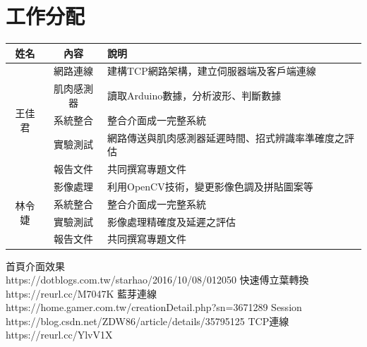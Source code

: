 \documentclass[12pt]{article}  %
\theoremstyle{plain}
\begin{document}
\section{工作分配}
\begin{tabular}{|c|c|p{9.5cm}|}
\hline
\cellcolor[HTML]{B2BEB5}姓名 & \cellcolor[HTML]{B2BEB5}內容 & \cellcolor[HTML]{B2BEB5}說明\\
\hline\hline
\multirow{5}{*}{王佳君} & 網路連線 & 建構TCP網路架構，建立伺服器端及客戶端連線 \\
\cline{2-3}
\multirow{5}{*}{} & 肌肉感測器 & 讀取Arduino數據，分析波形、判斷數據 \\
\cline{2-3}
\multirow{5}{*}{} & 系統整合 & 整合介面成一完整系統 \\
\cline{2-3}
\multirow{5}{*}{} & 實驗測試 & 網路傳送與肌肉感測器延遲時間、招式辨識率準確度之評估\\
\cline{2-3}
\multirow{5}{*}{} & 報告文件 & 共同撰寫專題文件 \\
\hline
\multirow{4}{*}{林令婕} & 影像處理 & 利用OpenCV技術，變更影像色調及拼貼圖案等 \\
\cline{2-3}
\multirow{4}{*}{} & 系統整合 & 整合介面成一完整系統 \\
\cline{2-3}
\multirow{4}{*}{} & 實驗測試 & 影像處理精確度及延遲之評估 \\
\cline{2-3}
\multirow{4}{*}{} & 報告文件 & 共同撰寫專題文件 \\
\hline
\end{tabular}
\newpage




\begin{thebibliography}{99}  %
首頁介面效果\\
https://dotblogs.com.tw/starhao/2016/10/08/012050
快速傅立葉轉換\\
https://reurl.cc/M7047K
藍芽連線\\
https://home.gamer.com.tw/creationDetail.php?sn=3671289
Session\\
https://blog.csdn.net/ZDW86/article/details/35795125
TCP連線\\
https://reurl.cc/YlvV1X
\end{thebibliography}
\newpage
\end{document}
